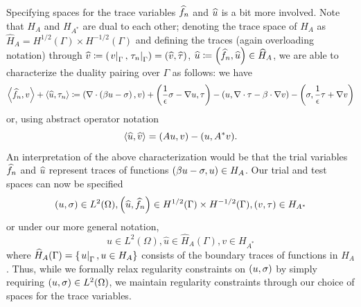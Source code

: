 Specifying spaces for the trace variables $\fnh$ and $\uh$ is a bit more involved.  Note that $H_{A}$ and $H_{A^*}$ are dual to each other; denoting the trace space of $H_A$ as $\widehat{H}_A = H^{1/2}(\Gamma) \times H^{-1/2}(\Gamma)$ and defining the traces (again overloading notation) through $\widehat{v} \coloneqq \LRp{\left.v\right|_\Gamma, \left.\tau_n\right|_\Gamma} = \LRp{\widehat{v},\widehat{\tau}}$, $\widehat{u} \coloneqq \LRp{\fnh,\uh} \in \widehat{H}_A$, we are able to characterize the duality pairing over $\Gamma$ as follows: we have
\[
\LRa{\fnh,v} + \LRa{\uh,\tau_n} \coloneqq \LRp{\div\LRp{\beta u - \sigma},v} + \LRp{\frac{1}{\epsilon}\sigma - \grad u,\tau} - \LRp{u, \Grad\cdot \tau - \beta\cdot \Grad v} - \LRp{\sigma, \frac{1}{\epsilon}\tau + \Grad v}
\]
or, using abstract operator notation
\[
\LRa{\widehat{u},\widehat{{v}}} = (A{u},{v})-({u},A^*{v}).
\]
An interpretation of the above characterization would be that the trial variables $\fnh$ and $\uh$ represent traces of functions $\LRp{\beta u - \sigma, u} \in H_A$.  Our trial and test spaces can now be specified
\[
\LRp{u,\sigma}\in L^2(\Omega), \LRp{\uh,\fnh}\in H^{1/2}(\Gamma) \times H^{-1/2}(\Gamma), \LRp{v,\tau}\in H_{A^*}
\]
or under our more general notation,
\[
u\in L^2(\Omega), \widehat{u}\in \widehat{H}_{A}(\Gamma), v\in H_{A^*}
\]
where $\widehat{H}_{A}(\Gamma) = \LRc{\left.u\right|_\Gamma, u\in H_A}$ consists of the boundary traces of functions in $H_A$.  
Thus, while we formally relax regularity constraints on $\LRp{u,\sigma}$ by simply requiring $\LRp{u,\sigma} \in L^2(\Omega)$, we maintain regularity constraints through our choice of spaces for the trace variables.  

